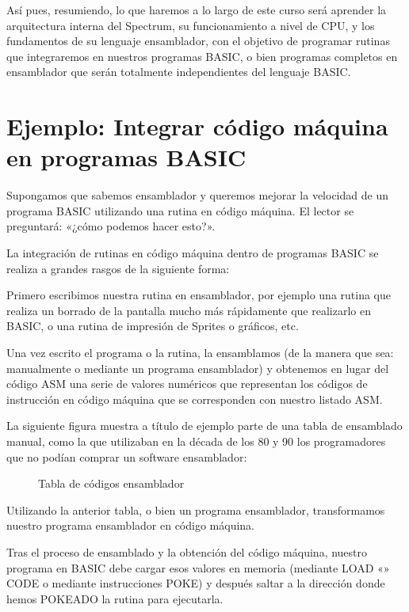 \documentclass[letterpaper,10pt,spanish]{sphinxmanual}
\begin{document}
Así pues, resumiendo, lo que haremos a lo largo de este curso será aprender la arquitectura interna del Spectrum, su funcionamiento a nivel de CPU, y los fundamentos de su lenguaje ensamblador, con el objetivo de programar rutinas que integraremos en nuestros programas BASIC, o bien programas completos en ensamblador que serán totalmente independientes del lenguaje BASIC.


\section{Ejemplo: Integrar código máquina en programas BASIC}
\label{\detokenize{02_introduccion/introduccion:ejemplo-integrar-codigo-maquina-en-programas-basic}}
Supongamos que sabemos ensamblador y queremos mejorar la velocidad de un programa BASIC utilizando una rutina en código máquina. El lector se preguntará: «¿cómo podemos hacer esto?».

La integración de rutinas en código máquina dentro de programas BASIC se realiza a grandes rasgos de la siguiente forma:

Primero escribimos nuestra rutina en ensamblador, por ejemplo una rutina que realiza un borrado de la pantalla mucho más rápidamente que realizarlo en BASIC, o una rutina de impresión de Sprites o gráficos, etc.

Una vez escrito el programa o la rutina, la ensamblamos (de la manera que sea: manualmente o mediante un programa ensamblador) y obtenemos en lugar del código ASM una serie de valores numéricos que representan los códigos de instrucción en código máquina que se corresponden con nuestro listado ASM.

La siguiente figura muestra a título de ejemplo parte de una tabla de ensamblado manual, como la que utilizaban en la década de los 80 y 90 los programadores que no podían comprar un software ensamblador:

\begin{figure}[htbp]
\centering
\capstart

\noindent{}
\caption{Tabla de códigos ensamblador}\label{\detokenize{02_introduccion/introduccion:id4}}\end{figure}

Utilizando la anterior tabla, o bien un programa ensamblador, transformamos nuestro programa ensamblador en código máquina.

Tras el proceso de ensamblado y la obtención del código máquina, nuestro programa en BASIC debe cargar esos valores en memoria (mediante LOAD «» CODE o mediante instrucciones POKE) y después saltar a la dirección donde hemos POKEADO la rutina para ejecutarla.
\end{document}
